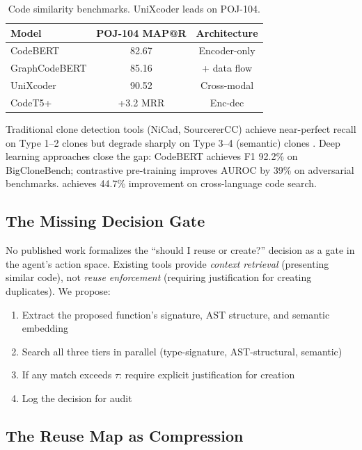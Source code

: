 \documentclass[11pt, a4paper, copyright]{googledeepmind}
\begin{document}
\begin{table}[h]
\centering
\small
\begin{tabular}{lcc}
\toprule
\textbf{Model} & \textbf{POJ-104 MAP@R} & \textbf{Architecture} \\
\midrule
CodeBERT \citep{feng2020codebert} & 82.67 & Encoder-only \\
GraphCodeBERT \citep{guo2021graphcodebert} & 85.16 & + data flow \\
UniXcoder \citep{guo2022unixcoder} & 90.52 & Cross-modal \\
CodeT5+ \citep{wang2023codet5plus} & +3.2 MRR & Enc-dec \\
\bottomrule
\end{tabular}
\caption{Code similarity benchmarks. UniXcoder leads on POJ-104.}
\label{tab:embeddings}
\end{table}

Traditional clone detection tools (NiCad, SourcererCC) achieve near-perfect recall on Type 1--2 clones but degrade sharply on Type 3--4 (semantic) clones \citep{svajlenko2015bigclonebench}. Deep learning approaches close the gap: CodeBERT achieves F1 92.2\% on BigCloneBench; contrastive pre-training improves AUROC by 39\% on adversarial benchmarks. \citet{saieva2024reinforest} achieves 44.7\% improvement on cross-language code search.

\subsection{The Missing Decision Gate}

No published work formalizes the ``should I reuse or create?'' decision as a gate in the agent's action space. Existing tools provide \emph{context retrieval} (presenting similar code), not \emph{reuse enforcement} (requiring justification for creating duplicates). We propose:

\begin{enumerate}[nosep]
    \item Extract the proposed function's signature, AST structure, and semantic embedding
    \item Search all three tiers in parallel (type-signature, AST-structural, semantic)
    \item If any match exceeds $\tau$: require explicit justification for creation
    \item Log the decision for audit
\end{enumerate}

\subsection{The Reuse Map as Compression}
\end{document}
